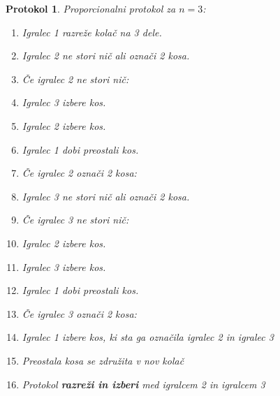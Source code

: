 \documentclass[a4paper, 12pt]{article}
\newtheorem{protokol}{Protokol}
\begin{document}
	\begin{protokol}
		\label{proporcionalni_3}
		Proporcionalni protokol za $n = 3$:
		\begin{enumerate}
			
			\item Igralec 1 razreže kolač na 3 dele.
			
			\item Igralec 2 ne stori nič ali označi 2 kosa.
			
			\item[] Če igralec 2 ne stori nič:
		
			\setcounter{enumi}{2}
			
			\item \qquad Igralec 3 izbere kos.
			
			\item \qquad Igralec 2 izbere kos.
			
			\item \qquad Igralec 1 dobi preostali kos.
			
			\item[] Če igralec 2 označi 2 kosa:

			\setcounter{enumi}{2}
			
			\item \qquad Igralec 3 ne stori nič ali označi 2 kosa.
			
			\item[] \qquad Če igralec 3 ne stori nič:
		
			\setcounter{enumi}{3}
			
			\item \qquad \qquad Igralec 2 izbere kos.
			
			\item \qquad \qquad Igralec 3 izbere kos.
			
			\item \qquad \qquad Igralec 1 dobi preostali kos.
			
			\item[] \qquad Če igralec 3 označi 2 kosa:

			\setcounter{enumi}{3}
			
			\item \qquad \qquad Igralec 1 izbere kos, ki sta ga označila igralec 2 in igralec 3
			
			\item \qquad \qquad Preostala kosa se združita v nov kolač
			
			\item \qquad \qquad Protokol \textbf{razreži in izberi} med igralcem 2 in igralcem 3
			
		\end{enumerate}
	\end{protokol}
\end{document}
